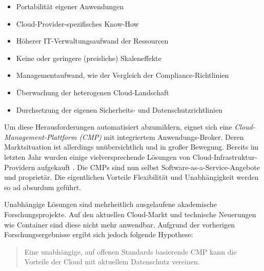 %
%
%
%
%

\begin{itemize}
	\item Portabilität eigener Anwendungen
	\item Cloud-Provider-spezifisches Know-How
	\item Höherer IT-Verwaltungsaufwand der Ressourcen
	\item Keine oder geringere (preisliche) Skaleneffekte
	\item Managementaufwand, wie der Vergleich der Compliance-Richtlinien
	\item Überwachung der heterogenen Cloud-Landschaft
	\item Durchsetzung der eigenen Sicherheits- und Datenschutzrichtlinien
\end{itemize}

\noindent
Um diese Herausforderungen automatisiert abzumildern, eignet sich eine \emph{Cloud-Management-Plattform (CMP)} mit integriertem Anwendungs-Broker. Deren Marktsituation ist allerdings unübersichtlich und in großer Bewegung. Bereits im letzten Jahr wurden einige vielversprechende Lösungen von Cloud-Infrastruktur-Providern aufgekauft \cite{gartner:2017:cloud-market-multicloud-trend}. Die CMPs sind nun selbst Software-as-a-Service-Angebote und proprietär. Die eigentlichen Vorteile Flexibilität und Unabhängigkeit werden so ad absurdum geführt.

Unabhängige Lösungen sind mehrheitlich ausgelaufene akademische Forschungsprojekte. Auf den aktuellen Cloud-Markt und technische Neuerungen wie Container sind diese nicht mehr anwendbar. Aufgrund der vorherigen Forschungsergebnisse ergibt sich jedoch folgende Hypothese:


\begin{verse}
	{Eine unabhängige, auf offenen Standards basierende CMP kann die Vorteile der Cloud mit aktuellem Datenschutz vereinen.}
\end{verse}

